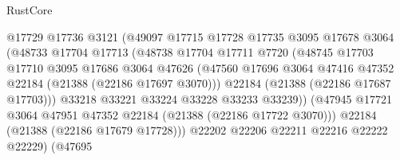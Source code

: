 \begin{lexlean}{RustCore}
\begin{coremodule}
                                  @17729
                                  @17736
                                  @3121
                                  (@49097
                                    @17715
                                    @17728
                                    @17735
                                    @3095
                                    @17678
                                    @3064
                                    (@48733
                                      @17704
                                      @17713
                                      (@48738
                                        @17704
                                        @17711
                                        @7720
                                        (@48745
                                          @17703
                                          @17710
                                          @3095
                                          @17686
                                          @3064
                                          @47626
                                          (@47560
                                            @17696
                                            @3064
                                            @47416
                                            @47352
                                            @22184
                                            (@21388 (@22186 @17697 @3070)))
                                          @22184
                                          (@21388 (@22186 @17687 @17703)))
                                        @33218
                                        @33221
                                        @33224
                                        @33228
                                        @33233
                                        @33239))
                                    (@47945
                                      @17721
                                      @3064
                                      @47951
                                      @47352
                                      @22184
                                      (@21388 (@22186 @17722 @3070)))
                                    @22184
                                    (@21388 (@22186 @17679 @17728)))
                                  @22202
                                  @22206
                                  @22211
                                  @22216
                                  @22222
                                  @22229)
                                (@47695

\end{coremodule}
\end{lexlean}
